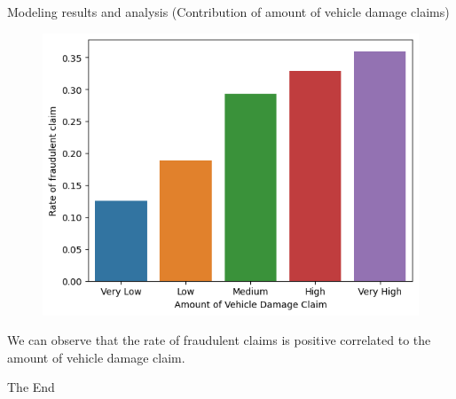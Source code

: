 \documentclass[aspectratio=169,xcolor=dvipsnames]{beamer}
\begin{document}
\begin{frame}{Modeling results and analysis (Contribution of amount of vehicle damage claims)}

\begin{figure}
\includegraphics[scale = 0.5]{AOVD.png}
\end{figure}

We can observe that the rate of fraudulent claims is positive correlated to the amount of vehicle damage claim. 

\end{frame}






\begin{frame}
    \Huge{\centerline{The End}}
\end{frame}

\end{document}
